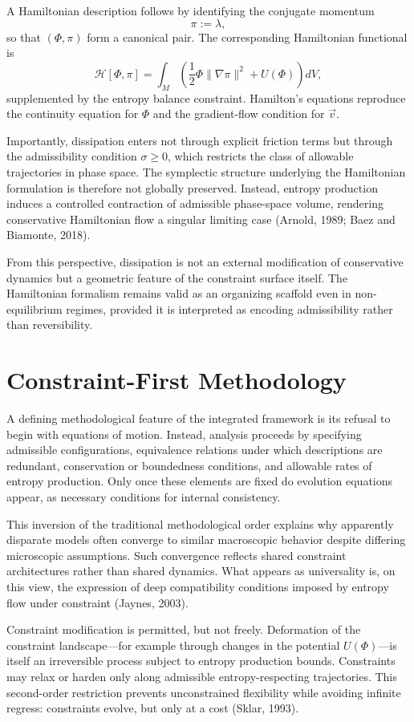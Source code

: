\documentclass[11pt]{article}
\begin{document}
A Hamiltonian description follows by identifying the conjugate momentum
\[
\pi := \lambda,
\]
so that $(\Phi,\pi)$ form a canonical pair. The corresponding Hamiltonian functional is
\[
\mathcal{H}[\Phi,\pi]
=
\int_M
\left(
\frac{1}{2} \Phi \lVert \nabla \pi \rVert^2 + U(\Phi)
\right) dV,
\]
supplemented by the entropy balance constraint. Hamilton’s equations reproduce the continuity equation for $\Phi$ and the gradient-flow condition for $\vec{v}$.

Importantly, dissipation enters not through explicit friction terms but through the admissibility condition $\sigma \ge 0$, which restricts the class of allowable trajectories in phase space. The symplectic structure underlying the Hamiltonian formulation is therefore not globally preserved. Instead, entropy production induces a controlled contraction of admissible phase-space volume, rendering conservative Hamiltonian flow a singular limiting case (Arnold, 1989; Baez and Biamonte, 2018).

From this perspective, dissipation is not an external modification of conservative dynamics but a geometric feature of the constraint surface itself. The Hamiltonian formalism remains valid as an organizing scaffold even in non-equilibrium regimes, provided it is interpreted as encoding admissibility rather than reversibility.

\section{Constraint-First Methodology}

A defining methodological feature of the integrated framework is its refusal to begin with equations of motion. Instead, analysis proceeds by specifying admissible configurations, equivalence relations under which descriptions are redundant, conservation or boundedness conditions, and allowable rates of entropy production. Only once these elements are fixed do evolution equations appear, as necessary conditions for internal consistency.

This inversion of the traditional methodological order explains why apparently disparate models often converge to similar macroscopic behavior despite differing microscopic assumptions. Such convergence reflects shared constraint architectures rather than shared dynamics. What appears as universality is, on this view, the expression of deep compatibility conditions imposed by entropy flow under constraint (Jaynes, 2003).

Constraint modification is permitted, but not freely. Deformation of the constraint landscape—for example through changes in the potential $U(\Phi)$—is itself an irreversible process subject to entropy production bounds. Constraints may relax or harden only along admissible entropy-respecting trajectories. This second-order restriction prevents unconstrained flexibility while avoiding infinite regress: constraints evolve, but only at a cost (Sklar, 1993).
\end{document}
